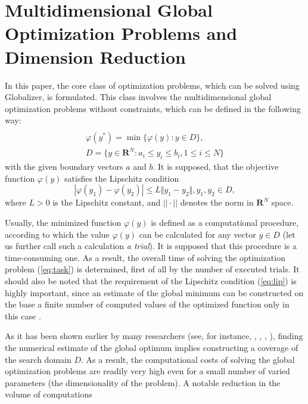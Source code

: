 \documentclass{aims}
\theoremstyle{definition}
\begin{document}
\section{Multidimensional Global Optimization Problems and Dimension Reduction}
\label{sec:problem}
In this paper, the core class of optimization problems, which can be solved using
Globalizer, is formulated. This class involves the multidimensional global
optimization problems without constraints, which can be defined in the following way:
\begin{equation}
\label{eq:task}
\begin{array}{cr}\\
  \varphi(y^*)=\min\{\varphi(y):y\in D\}, \\
  D=\{y\in \mathbf{R}^N:a_i\leq y_i\leq{b_i}, 1\leq{i}\leq{N}\}
\end{array}
\end{equation}
with the given boundary vectors  $a$ and  $b$. It is supposed, that the objective function \(\varphi(y)\) satisfies the Lipschitz condition
\begin{equation}
\label{eq:lip}
|\varphi(y_1)-\varphi(y_2)|\leq L\Vert y_1-y_2\Vert,y_1,y_2\in D,
\end{equation}
where \(L>0\) is the Lipschitz constant, and \(||\cdot||\) denotes the norm in \(\mathbf{R}^N\) space.
\par
Usually, the minimized function \(\varphi(y)\) is defined as a computational procedure,
according to which the value \(\varphi(y)\) can be calculated for any vector \(y\in D\)
(let us further call such a calculation \textit{a trial}). It is supposed that this procedure
is a time-consuming one. As a result, the overall time of solving the optimization
problem (\ref{eq:task}) is determined, first of all by the number of executed trials.
It should also be noted that the requirement of the Lipschitz condition (\ref{eq:lip})
is highly important, since an estimate of the global minimum can be constructed on the
base a finite number of computed values of the optimized function only in this case .
\par
As it has been shown earlier by many researchers
(see, for instance, \cite{floudasPardalosGOState}, \cite{horstTuyGO}, \cite{pinterGO}, \cite{strSergGO}),
finding the numerical estimate of the global optimum implies constructing a coverage of
the search domain \(D\). As a result, the computational costs of solving the global
optimization problems are readily very high even for a small number of varied parameters
(the dimensionality of the problem). A notable reduction in the volume of computations
\end{document}
